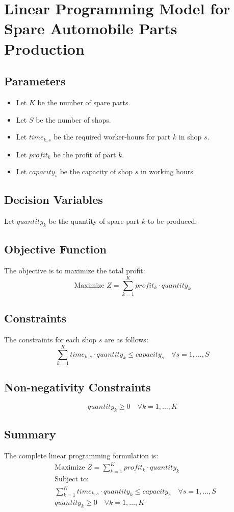 \documentclass{article}
\begin{document}
\section*{Linear Programming Model for Spare Automobile Parts Production}

\subsection*{Parameters}
\begin{itemize}
    \item Let \( K \) be the number of spare parts.
    \item Let \( S \) be the number of shops.
    \item Let \( time_{k,s} \) be the required worker-hours for part \( k \) in shop \( s \).
    \item Let \( profit_{k} \) be the profit of part \( k \).
    \item Let \( capacity_{s} \) be the capacity of shop \( s \) in working hours.
\end{itemize}

\subsection*{Decision Variables}
Let \( quantity_{k} \) be the quantity of spare part \( k \) to be produced.

\subsection*{Objective Function}
The objective is to maximize the total profit:
\[
\text{Maximize } Z = \sum_{k=1}^{K} profit_{k} \cdot quantity_{k}
\]

\subsection*{Constraints}
The constraints for each shop \( s \) are as follows:
\[
\sum_{k=1}^{K} time_{k,s} \cdot quantity_{k} \leq capacity_{s} \quad \forall s = 1, \ldots, S
\]

\subsection*{Non-negativity Constraints}
\[
quantity_{k} \geq 0 \quad \forall k = 1, \ldots, K
\]

\subsection*{Summary}
The complete linear programming formulation is:
\begin{align*}
& \text{Maximize } Z = \sum_{k=1}^{K} profit_{k} \cdot quantity_{k} \\
& \text{Subject to:} \\
& \sum_{k=1}^{K} time_{k,s} \cdot quantity_{k} \leq capacity_{s} \quad \forall s = 1, \ldots, S \\
& quantity_{k} \geq 0 \quad \forall k = 1, \ldots, K
\end{align*}
\end{document}
